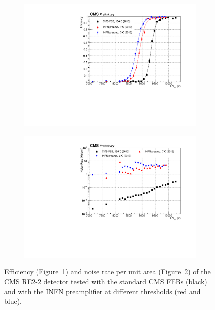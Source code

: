 	\begin{figure}[H]
		\begin{subfigure}{.5\linewidth}
		    \centering
			\includegraphics[width=\linewidth]{fig/chapt6/INFN-Preamplifier-Shift.pdf}
			\caption{\label{fig:INFN-preamp:A}}
		\end{subfigure}
		\begin{subfigure}{.5\linewidth}
		    \centering
			\includegraphics[width = \linewidth]{fig/chapt6/INFN-Preamplifier-Rate-Shift.pdf}
			\caption{\label{fig:INFN-preamp:B}}
		\end{subfigure}
		\caption{\label{fig:INFN-preamp} Efficiency (Figure~\ref{fig:INFN-preamp:A}) and noise rate per unit area (Figure~\ref{fig:INFN-preamp:B}) of the CMS RE2-2 detector tested with the standard CMS FEBs (black) and with the INFN preamplifier at different thresholds (red and blue).}
	\end{figure}
	
